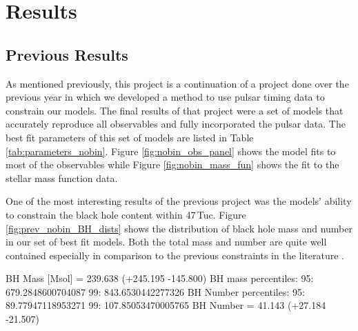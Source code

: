 


\section{Results}



\subsection{Previous Results}

As mentioned previously, this project is a continuation of a project done over the previous year in
which we developed a method to use pulsar timing data to constrain our models. The final results of
that project were a set of models that accurately reproduce all observables and fully incorporated
the pulsar data. The best fit parameters of this set of models are listed in Table
\ref{tab:parameters_nobin}. Figure \ref{fig:nobin_obs_panel} shows the model fits to most of
the observables while Figure \ref{fig:nobin_mass_fun} shows the fit to the stellar mass function
data.

One of the most interesting results of the previous project was the models' ability to constrain the
black hole content within 47\,Tuc. Figure \ref{fig:prev_nobin_BH_dists} shows the distribution of
black hole mass and number in  our set of best fit models. Both the total mass and number are quite
well contained especially in comparison to the previous constraints in the literature \citep[see
	e.g.][]{Henault-Brunet2020,Weatherford2019}.


BH Mass [Msol] = 239.638 (+245.195 -145.800)
BH mass percentiles:
95: 679.2848600704087
99: 843.6530442277326
BH Number percentiles:
95: 89.77947118953271
99: 107.85053470005765
BH Number  = 41.143 (+27.184 -21.507)



